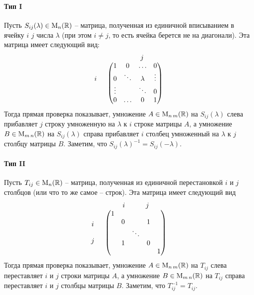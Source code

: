 \paragraph{Тип I} Пусть $S_{ij}(\lambda)\in\operatorname{M}_{n}(\mathbb R)$ -- матрица, полученная из единичной вписыванием в ячейку $i$ $j$ числа $\lambda$ (при этом $i\neq j$, то есть ячейка берется не на диагонали). Эта матрица имеет следующий вид:
\[
\begin{tabular}{cc}
{}&{\quad \quad $j$}\\
{
$
\begin{matrix}
{}\\{i}\\{}\\{}
\end{matrix}
$}&{
$
\begin{pmatrix}
{1}&{0}&{\ldots}&{0}\\
{0}&{\ddots}&{\lambda}&{\vdots}\\
{\vdots}&{}&{\ddots}&{0}\\
{0}&{\ldots}&{0}&{1}\\
\end{pmatrix}
$
}
\end{tabular}
\]
Тогда прямая проверка показывает, умножение $A\in\operatorname{M}_{n\,m}(\mathbb R)$ на $S_{ij}(\lambda)$ слева прибавляет $j$ строку умноженную на $\lambda$ к $i$ строке матрицы $A$, а умножение $B\in\operatorname{M}_{m\,n}(\mathbb R)$ на $S_{ij}(\lambda)$ справа прибавляет $i$ столбец умноженный на $\lambda$ к $j$ столбцу матрицы $B$. Заметим, что $S_{ij}(\lambda)^{-1} = S_{ij}(-\lambda)$.

\paragraph{Тип II} Пусть $T_{ij}\in\operatorname{M}_{n}(\mathbb R)$ -- матрица, полученная из единичной перестановкой $i$ и $j$ столбцов (или что то же самое -- строк). Эта матрица имеет следующий вид
\[
\begin{tabular}{cc}
{}&{$i$\quad \quad\quad $j$}\\
{
$
\begin{matrix}
{}\\{i}\\{}\\{j}\\{}
\end{matrix}
$}&{
$
\begin{pmatrix}
{1}&{}&{}&{}&{}\\
{}&{0}&{}&{1}&{}\\
{}&{}&{\ddots}&{}&{}\\
{}&{1}&{}&{0}&{}\\
{}&{}&{}&{}&{1}\\
\end{pmatrix}
$
}
\end{tabular}
\]
Тогда прямая проверка показывает, умножение $A\in\operatorname{M}_{n\,m}(\mathbb R)$ на $T_{ij}$ слева переставляет $i$ и $j$ строки матрицы $A$, а умножение $B\in\operatorname{M}_{m\,n}(\mathbb R)$ на $T_{ij}$ справа переставляет $i$ и $j$ столбцы матрицы $B$. Заметим, что $T_{ij}^{-1} = T_{ij}$.



